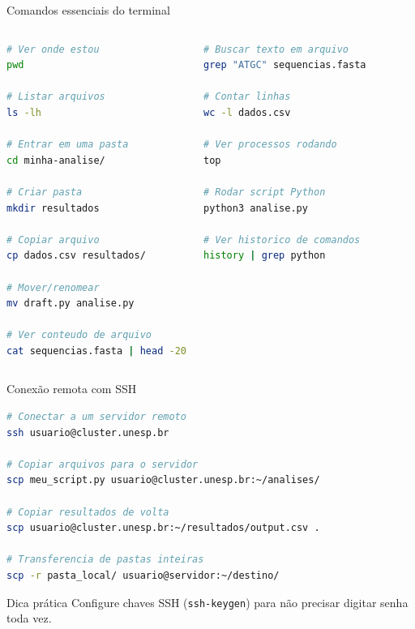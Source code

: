 \begin{frame}[fragile, shrink=20]{Comandos essenciais do terminal}
\begin{columns}
\begin{lstlisting}[language=bash, caption=Navegação e arquivos, basicstyle=\ttfamily\footnotesize]
# Ver onde estou
pwd

# Listar arquivos
ls -lh

# Entrar em uma pasta
cd minha-analise/

# Criar pasta
mkdir resultados

# Copiar arquivo
cp dados.csv resultados/

# Mover/renomear
mv draft.py analise.py

# Ver conteudo de arquivo
cat sequencias.fasta | head -20
\end{lstlisting}

\begin{lstlisting}[language=bash, caption=Busca e processos, basicstyle=\ttfamily\footnotesize]
# Buscar texto em arquivo
grep "ATGC" sequencias.fasta

# Contar linhas
wc -l dados.csv

# Ver processos rodando
top

# Rodar script Python
python3 analise.py

# Ver historico de comandos
history | grep python
\end{lstlisting}
\end{columns}
\end{frame}

\begin{frame}[fragile, shrink=15]{Conexão remota com SSH}

\begin{lstlisting}[language=bash, basicstyle=\ttfamily\footnotesize]
# Conectar a um servidor remoto
ssh usuario@cluster.unesp.br

# Copiar arquivos para o servidor
scp meu_script.py usuario@cluster.unesp.br:~/analises/

# Copiar resultados de volta
scp usuario@cluster.unesp.br:~/resultados/output.csv .

# Transferencia de pastas inteiras
scp -r pasta_local/ usuario@servidor:~/destino/
\end{lstlisting}

\vspace{0.2cm}
\begin{exampleblock}{Dica prática}
Configure chaves SSH (\texttt{ssh-keygen}) para não precisar digitar senha toda vez.
\end{exampleblock}
\end{frame}

